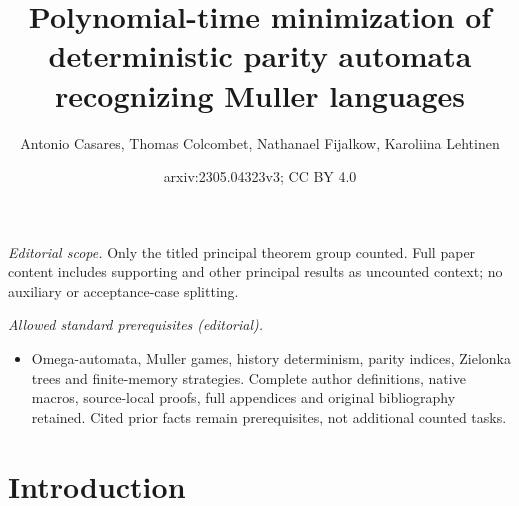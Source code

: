 \documentclass[10pt,a4paper]{amsart}
\title{Polynomial-time minimization of deterministic parity automata recognizing Muller languages}
\author{Antonio Casares, Thomas Colcombet, Nathanael Fijalkow, Karoliina Lehtinen}
\date{arxiv:2305.04323v3; CC BY 4.0}
\begin{document}
\maketitle
\noindent\textit{Editorial scope.} Only the titled principal theorem group counted. Full paper content includes supporting and other principal results as uncounted context; no auxiliary or acceptance-case splitting.\par\medskip
\noindent\textit{Allowed standard prerequisites (editorial).}\begin{itemize}
\item Omega-automata, Muller games, history determinism, parity indices, Zielonka trees and finite-memory strategies. Complete author definitions, native macros, source-local proofs, full appendices and original bibliography retained. Cited prior facts remain prerequisites, not additional counted tasks.
\end{itemize}\medskip
	\section{Introduction}\label{section:introduction}
\end{document}
